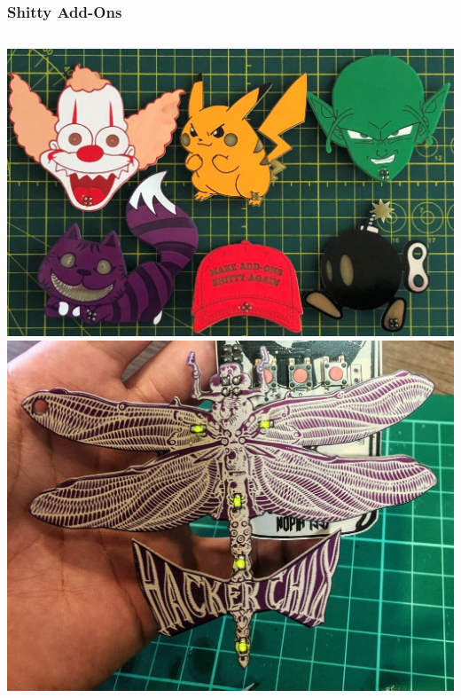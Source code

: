 \documentclass[t]{beamer}
\begin{document}
\begin{frame}
\frametitle{Shitty Add-Ons}
\begin{columns}[c]
	\centering
		\includegraphics[width=0.8\linewidth]{sao.jpg}
		\includegraphics[width=0.7\linewidth]{hackerchix.jpg}
	

\end{columns}
\end{frame}
\end{document}
